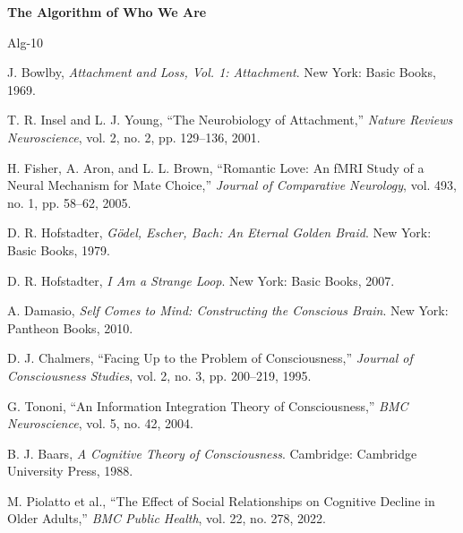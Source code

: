 \documentclass[12pt, a4paper]{article}
\begin{document}
\vspace{1em}
{\noindent\bfseries The Algorithm of Who We Are}\par\smallskip
\begin{thebibliography}{Alg-10}

 J. Bowlby, \textit{Attachment and Loss, Vol. 1: Attachment}. New York:
    Basic Books, 1969.

 T. R. Insel and L. J. Young, ``The Neurobiology of Attachment,''
    \textit{Nature Reviews Neuroscience}, vol. 2, no. 2, pp. 129--136, 2001.

 H. Fisher, A. Aron, and L. L. Brown, ``Romantic Love: An fMRI Study of a
    Neural Mechanism for Mate Choice,'' \textit{Journal of Comparative Neurology}, vol. 493, no. 1,
    pp. 58--62, 2005.

 D. R. Hofstadter, \textit{G\"{o}del, Escher, Bach: An Eternal Golden
    Braid}. New York: Basic Books, 1979.

 D. R. Hofstadter, \textit{I Am a Strange Loop}. New York: Basic Books,
    2007.

 A. Damasio, \textit{Self Comes to Mind: Constructing the Conscious Brain}.
    New York: Pantheon Books, 2010.

 D. J. Chalmers, ``Facing Up to the Problem of Consciousness,''
    \textit{Journal of Consciousness Studies}, vol. 2, no. 3, pp. 200--219, 1995.

 G. Tononi, ``An Information Integration Theory of Consciousness,''
    \textit{BMC Neuroscience}, vol. 5, no. 42, 2004.

 B. J. Baars, \textit{A Cognitive Theory of Consciousness}. Cambridge:
    Cambridge University Press, 1988.

 M. Piolatto et al., ``The Effect of Social Relationships on Cognitive
    Decline in Older Adults,'' \textit{BMC Public Health}, vol. 22, no. 278, 2022.

\end{thebibliography}
\end{document}

